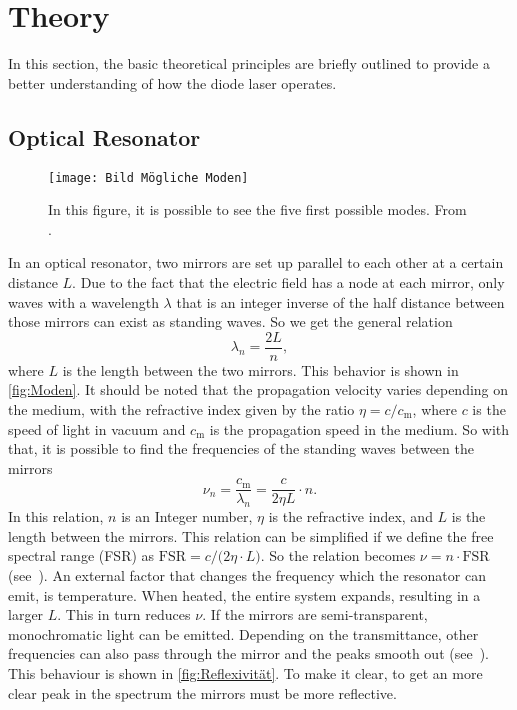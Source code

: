 \section{Theory}\label{sec:theorie}
In this section, the basic theoretical principles are briefly outlined to provide a better understanding of how the diode laser operates.
\subsection{ Optical Resonator}
\label{subsec:OptRes}
\begin{figure}[h]
	
	\centering
	\texttt{[image: Bild Mögliche Moden]}
	\caption{In this figure, it is possible to see the five first possible modes. From \autocite{BildModen}.}
	\label{fig:Moden}
\end{figure}
In an optical resonator, two mirrors are set up parallel to each other at a certain distance $L$. Due to the fact that the electric field has a node at each mirror, only waves with a wavelength $\lambda$ that is an integer inverse of the half distance between those mirrors can exist as standing waves. So we get the general relation
$$\lambda_n=\frac{2 L}{n}, $$ 
where $L$ is the length between the two mirrors. 
This behavior is shown in \autoref{fig:Moden}. It should be noted that the propagation velocity varies depending on the medium, with the refractive index given by the ratio $\eta=c/c_\mathrm{m}$, where $c$ is the speed of light in vacuum and $c_\mathrm{m}$ is the propagation speed in the medium. So with that, it is possible to find the frequencies of the standing waves between the mirrors
$$\nu_n = \frac{c_\mathrm{m}}{\lambda_n} = \frac{c}{2\eta L}\cdot n .$$
In this relation, $n$ is an Integer number, $\eta$ is the refractive index, and $L$ is the length between the mirrors. This relation can be simplified if we define the free spectral range (FSR) as $\mathrm{FSR}={c}/({2\eta\cdot L)}$. So the relation becomes $\nu=n\cdot\mathrm{FSR}$ (see~\autocite{diodenlaser}). An external factor that changes the frequency which the resonator can emit, is temperature. When heated, the entire system expands, resulting in a larger $L$. This in turn reduces $\nu$.
If the mirrors are semi-transparent, monochromatic light can be emitted. Depending on the transmittance, other frequencies can also pass through the mirror and the peaks smooth out (see~\autocite{Fabry-Perot_Interferometer_Tutorial}). This behaviour is shown in \autoref{fig:Reflexivität}. To make it clear, to get an more clear peak in the spectrum the mirrors must be more reflective.


